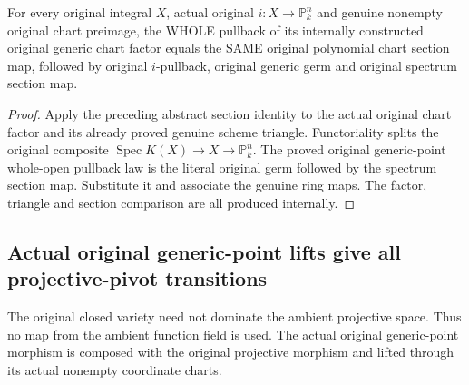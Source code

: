 \begin{theorem}
\label{thm:seven-original-projective-generic-whole-section-triangle-route}
\leanok
{}
For every original integral $X$, actual original $i:X\to\mathbb P^n_k$
and genuine nonempty original chart preimage, the WHOLE pullback of
its internally constructed original generic chart factor equals the
SAME original polynomial chart section map, followed by original
$i$-pullback, original generic germ and original spectrum section map.
\end{theorem}
\begin{proof}
Apply the preceding abstract section identity to the actual original
chart factor and its already proved genuine scheme triangle.
Functoriality splits the original composite $\operatorname{Spec}K(X)
\to X\to\mathbb P^n_k$. The proved original generic-point whole-open
pullback law is the literal original germ followed by the spectrum
section map. Substitute it and associate the genuine ring maps.
The factor, triangle and section comparison are all produced internally.
\end{proof}

\subsection{Actual original generic-point lifts give all projective-pivot transitions}
The original closed variety need not dominate the ambient projective
space. Thus no map from the ambient function field is used. The actual
original generic-point morphism is composed with the original projective
morphism and lifted through its actual nonempty coordinate charts.


